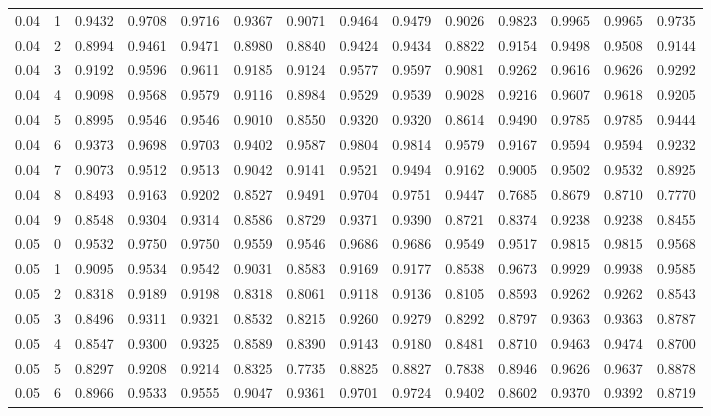 \documentclass[10pt, conference, a4paper, final]{IEEEtran}
\begin{document}
\begin{table}[ht]
{\begin{tabular}{cccccccccccccc}
        0.04 & 1 & 0.9432 & 0.9708 & 0.9716 & 0.9367 & 0.9071 & 0.9464 & 0.9479 & 0.9026 & 0.9823 & 0.9965 & 0.9965 & 0.9735 \\
        0.04 & 2 & 0.8994 & 0.9461 & 0.9471 & 0.8980 & 0.8840 & 0.9424 & 0.9434 & 0.8822 & 0.9154 & 0.9498 & 0.9508 & 0.9144 \\
        0.04 & 3 & 0.9192 & 0.9596 & 0.9611 & 0.9185 & 0.9124 & 0.9577 & 0.9597 & 0.9081 & 0.9262 & 0.9616 & 0.9626 & 0.9292 \\
        0.04 & 4 & 0.9098 & 0.9568 & 0.9579 & 0.9116 & 0.8984 & 0.9529 & 0.9539 & 0.9028 & 0.9216 & 0.9607 & 0.9618 & 0.9205 \\
        0.04 & 5 & 0.8995 & 0.9546 & 0.9546 & 0.9010 & 0.8550 & 0.9320 & 0.9320 & 0.8614 & 0.9490 & 0.9785 & 0.9785 & 0.9444 \\
        0.04 & 6 & 0.9373 & 0.9698 & 0.9703 & 0.9402 & 0.9587 & 0.9804 & 0.9814 & 0.9579 & 0.9167 & 0.9594 & 0.9594 & 0.9232 \\
        0.04 & 7 & 0.9073 & 0.9512 & 0.9513 & 0.9042 & 0.9141 & 0.9521 & 0.9494 & 0.9162 & 0.9005 & 0.9502 & 0.9532 & 0.8925 \\
        0.04 & 8 & 0.8493 & 0.9163 & 0.9202 & 0.8527 & 0.9491 & 0.9704 & 0.9751 & 0.9447 & 0.7685 & 0.8679 & 0.8710 & 0.7770 \\
        0.04 & 9 & 0.8548 & 0.9304 & 0.9314 & 0.8586 & 0.8729 & 0.9371 & 0.9390 & 0.8721 & 0.8374 & 0.9238 & 0.9238 & 0.8455 \\
        0.05 & 0 & 0.9532 & 0.9750 & 0.9750 & 0.9559 & 0.9546 & 0.9686 & 0.9686 & 0.9549 & 0.9517 & 0.9815 & 0.9815 & 0.9568 \\
        0.05 & 1 & 0.9095 & 0.9534 & 0.9542 & 0.9031 & 0.8583 & 0.9169 & 0.9177 & 0.8538 & 0.9673 & 0.9929 & 0.9938 & 0.9585 \\
        0.05 & 2 & 0.8318 & 0.9189 & 0.9198 & 0.8318 & 0.8061 & 0.9118 & 0.9136 & 0.8105 & 0.8593 & 0.9262 & 0.9262 & 0.8543 \\
        0.05 & 3 & 0.8496 & 0.9311 & 0.9321 & 0.8532 & 0.8215 & 0.9260 & 0.9279 & 0.8292 & 0.8797 & 0.9363 & 0.9363 & 0.8787 \\
        0.05 & 4 & 0.8547 & 0.9300 & 0.9325 & 0.8589 & 0.8390 & 0.9143 & 0.9180 & 0.8481 & 0.8710 & 0.9463 & 0.9474 & 0.8700 \\
        0.05 & 5 & 0.8297 & 0.9208 & 0.9214 & 0.8325 & 0.7735 & 0.8825 & 0.8827 & 0.7838 & 0.8946 & 0.9626 & 0.9637 & 0.8878 \\
        0.05 & 6 & 0.8966 & 0.9533 & 0.9555 & 0.9047 & 0.9361 & 0.9701 & 0.9724 & 0.9402 & 0.8602 & 0.9370 & 0.9392 & 0.8719 \\

\end{tabular}}
\end{table}
\end{document}
